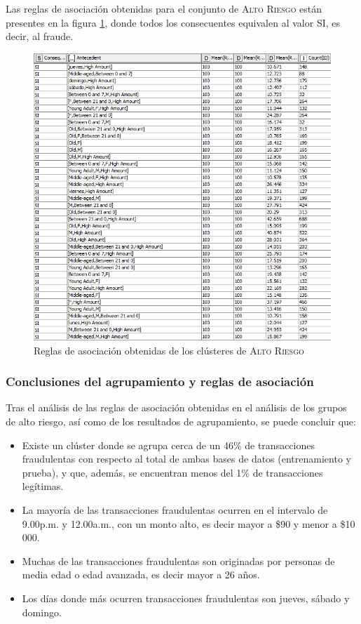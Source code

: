 Las reglas de asociación obtenidas para el conjunto de \textsc{Alto Riesgo} están presentes en la figura \ref{fig:reglas-train}, donde todos los consecuentes equivalen al valor \textsc{SI}, es decir, al fraude.

\begin{figure}[H]
	\centering
	\includegraphics[width=0.6\linewidth]{figuras/Jenn/reglas-train}
	\caption{Reglas de asociación obtenidas de los clústeres de \textsc{Alto Riesgo}}
	\label{fig:reglas-train}
\end{figure}


\subsubsection{Conclusiones del agrupamiento y reglas de asociación}

Tras el análisis de las reglas de asociación obtenidas en el análisis de los grupos de alto riesgo, así como de los resultados de agrupamiento, se puede concluir que:
\begin{itemize}
	\item Existe un clúster donde se agrupa cerca de un 46\% de transacciones fraudulentas con respecto al total de ambas bases de datos (entrenamiento y prueba), y que, además, se encuentran menos del 1\% de transacciones legítimas.
	\item La mayoría de las transacciones fraudulentas ocurren en el intervalo de 9.00p.m. y 12.00a.m., con un monto alto, es decir mayor a \$90 y menor a \$10 000.
	\item Muchas de las transacciones fraudulentas son originadas por personas de media edad o edad avanzada, es decir mayor a 26 años.
	\item Los días donde más ocurren transacciones fraudulentas son jueves, sábado y domingo.
\end{itemize}


